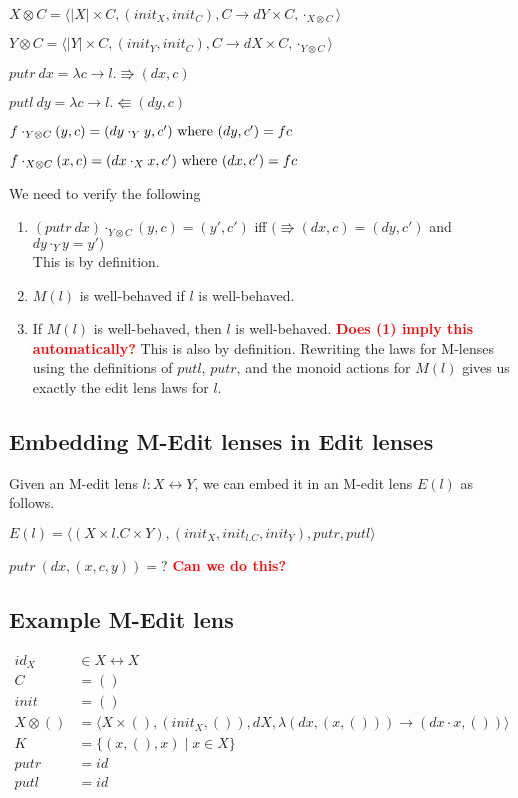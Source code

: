 \documentclass[a4paper,10pt]{article}
\newcommand{\finish}[1]{#1}
\newcommand{\comment}[1]{\finish{\textbf{\textcolor{red}{#1}}}}
\begin{document}
$X \otimes C = \langle |X| \times C, (init_X, init_C), C \to dY \times C, \cdot_{X \otimes C} \rangle$

$Y \otimes C = \langle |Y| \times C, (init_Y, init_C), C \to dX \times C, \cdot_{Y \otimes C} \rangle$

$ putr~dx = \lambda c \to l.\Rrightarrow (dx, c) $

$ putl~dy = \lambda c \to l.\Lleftarrow (dy, c) $

$ f \cdot_{Y \otimes C} (y,c) = (dy \cdot_Y y, c') \textnormal{ where } (dy, c') = f c$

$ f \cdot_{X \otimes C} (x,c) = (dx \cdot_X x, c') \textnormal{ where } (dx, c') = f c$

We need to verify the following
\begin{enumerate}
 \item $(putr~dx) \cdot_{Y \otimes C} (y,c) = (y', c')$ iff $(\Rrightarrow (dx, c) = (dy, c')$ and $dy \cdot_Y y = y')$\\
       This is by definition.
 \item $M(l)$ is well-behaved if $l$ is well-behaved.
 \item If $M(l)$ is well-behaved, then $l$ is well-behaved. \comment{Does (1) imply this automatically?}
       This is also by definition. Rewriting the laws for M-lenses using the definitions of $putl$, $putr$, and the monoid actions for $M(l)$ gives us exactly the edit lens laws for $l$.
\end{enumerate}

\subsection{Embedding M-Edit lenses in Edit lenses}
Given an M-edit lens $l:X \leftrightarrow Y$, we can embed it in an M-edit lens $E(l)$ as follows. 

$E(l) = \langle (X \times l.C \times Y), (init_X, init_{l.C}, init_Y), putr, putl \rangle $

$putr~(dx, (x,c,y)) = ?$ \comment{Can we do this?}

\subsection{Example M-Edit lens}
  \begin{align*}
    id_X &\in X \leftrightarrow X \\
    C &= () \\
    init &= () \\
    X \otimes () &= \langle X \times (), (init_X, ()), dX, \lambda (dx,(x,())) \to (dx \cdot x, ()) \rangle \\
    K &= \{ (x, (), x) \mid x \in X \} \\
    putr &= id \\
    putl &= id
  \end{align*}
  
\end{document}
